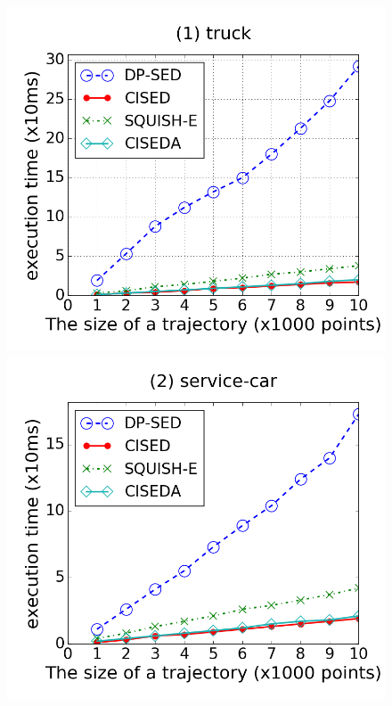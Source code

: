 \begin{figure}[tb!]
\centering
\includegraphics[scale = 0.245]{figures/Exp-time-size-truck.png}
\includegraphics[scale = 0.245]{figures/Exp-time-size-service.png}

\end{figure}
